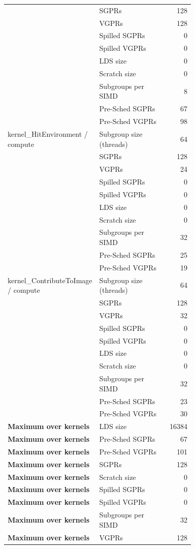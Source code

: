\begin{longtable}{p{0.30\linewidth}p{0.43\linewidth}r}
 & SGPRs & 128 \\
 & VGPRs & 128 \\
 & Spilled SGPRs & 0 \\
 & Spilled VGPRs & 0 \\
 & LDS size & 0 \\
 & Scratch size & 0 \\
 & Subgroups per SIMD & 8 \\
 & Pre-Sched SGPRs & 67 \\
 & Pre-Sched VGPRs & 98 \\
\hline
kernel\_HitEnvironment / compute & Subgroup size (threads) & 64 \\
 & SGPRs & 128 \\
 & VGPRs & 24 \\
 & Spilled SGPRs & 0 \\
 & Spilled VGPRs & 0 \\
 & LDS size & 0 \\
 & Scratch size & 0 \\
 & Subgroups per SIMD & 32 \\
 & Pre-Sched SGPRs & 25 \\
 & Pre-Sched VGPRs & 19 \\
\hline
kernel\_ContributeToImage / compute & Subgroup size (threads) & 64 \\
 & SGPRs & 128 \\
 & VGPRs & 32 \\
 & Spilled SGPRs & 0 \\
 & Spilled VGPRs & 0 \\
 & LDS size & 0 \\
 & Scratch size & 0 \\
 & Subgroups per SIMD & 32 \\
 & Pre-Sched SGPRs & 23 \\
 & Pre-Sched VGPRs & 30 \\
\hline
\textbf{Maximum over kernels} & LDS size & 16384 \\
\textbf{Maximum over kernels} & Pre-Sched SGPRs & 67 \\
\textbf{Maximum over kernels} & Pre-Sched VGPRs & 101 \\
\textbf{Maximum over kernels} & SGPRs & 128 \\
\textbf{Maximum over kernels} & Scratch size & 0 \\
\textbf{Maximum over kernels} & Spilled SGPRs & 0 \\
\textbf{Maximum over kernels} & Spilled VGPRs & 0 \\
\textbf{Maximum over kernels} & Subgroups per SIMD & 32 \\
\textbf{Maximum over kernels} & VGPRs & 128 \\
\hline
\end{longtable}
